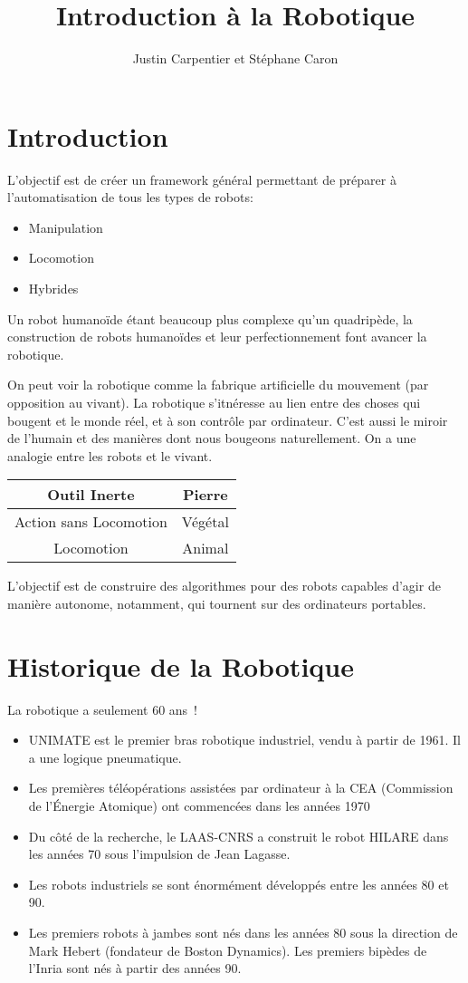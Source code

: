\documentclass[math]{cours}
\title{Introduction à la Robotique}
\author{Justin Carpentier et Stéphane Caron}
\begin{document}
\bettertitle
\section*{Introduction}
L'objectif est de créer un framework général permettant de préparer à l'automatisation de tous les types de robots:
\begin{itemize}
	\item Manipulation
	\item Locomotion
	\item Hybrides
\end{itemize}
Un robot humanoïde étant beaucoup plus complexe qu'un quadripède, la construction de robots humanoïdes et leur perfectionnement font avancer la robotique.

On peut voir la robotique comme la fabrique artificielle du mouvement (par opposition au vivant).
La robotique s'itnéresse au lien entre des choses qui bougent et le monde réel, et à son contrôle par ordinateur.
C'est aussi le miroir de l'humain et des manières dont nous bougeons naturellement.
On a une analogie entre les robots et le vivant.
\begin{center}\begin{tabular}{cc}
		Outil Inerte & Pierre\\
		\midrule
		Action sans Locomotion & Végétal\\
		\midrule
		Locomotion & Animal
\end{tabular}\end{center}
L'objectif est de construire des algorithmes pour des robots capables d'agir de manière autonome, notamment, qui tournent sur des ordinateurs portables.

\section*{Historique de la Robotique}
La robotique a seulement 60 ans~!
\begin{itemize}
	\item UNIMATE est le premier bras robotique industriel, vendu à partir de 1961.
		Il a une logique pneumatique.
	\item Les premières téléopérations assistées par ordinateur à la CEA (Commission de l'Énergie Atomique) ont commencées dans les années 1970
	\item Du côté de la recherche, le LAAS-CNRS a construit le robot HILARE dans les années 70 sous l'impulsion de Jean Lagasse.
	\item Les robots industriels se sont énormément développés entre les années 80 et 90.
	\item Les premiers robots à jambes sont nés dans les années 80 sous la direction de Mark Hebert (fondateur de Boston Dynamics).
		Les premiers bipèdes de l'Inria sont nés à partir des années 90.
\end{itemize}
\end{document}
